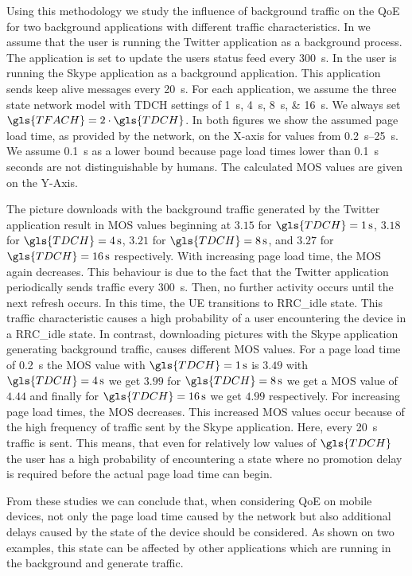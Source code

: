 Using this methodology we study the influence of background traffic on the \gls{QoE} for two background applications with different traffic characteristics.
In  we assume that the user is running the Twitter application as a background process.
The application is set to update the users status feed every \SI{300}{\second}.
In  the user is running the Skype application as a background application.
This application sends keep alive messages every \SI{20}{\second}.
For each application, we assume the three state network model with \gls{TDCH} settings of \SIlist{1;4;8;16}{\second}.
We always set \(\gls{TFACH} = 2\cdot \gls{TDCH}\).
In both figures we show the assumed page load time, as provided by the network, on the X-axis for values from \SIrange{0.2}{25}{\second}.
We assume \SI{0.1}{\second} as a lower bound because page load times lower than \SI{0.1}{\second} seconds are not distinguishable \cite{egger2012b} by humans.
The calculated \gls{MOS} values are given on the Y-Axis.

The picture downloads with the background traffic generated by the Twitter application result in \gls{MOS} values beginning at \(3.15\) for \(\gls{TDCH} = \SI{1}{\second}\), \(3.18\) for \(\gls{TDCH} = \SI{4}{\second}\), \(3.21\) for \(\gls{TDCH} = \SI{8}{\second}\), and \(3.27\) for \(\gls{TDCH} = \SI{16}{\second}\) respectively.
With increasing page load time, the \gls{MOS} again decreases.
This behaviour is due to the fact that the Twitter application periodically sends traffic every \SI{300}{\second}.
Then, no further activity occurs until the next refresh occurs.
In this time, the \gls{UE} transitions to \gls{RRC_idle} state.
This traffic characteristic causes a high probability of a user encountering the device in a \gls{RRC_idle} state.
In contrast, downloading pictures with the Skype application generating background traffic, causes different \gls{MOS} values.
For a page load time of \SI{0.2}{\second} the \gls{MOS} value with \(\gls{TDCH} = \SI{1}{\second}\) is \(3.49\) with \(\gls{TDCH} = \SI{4}{\second}\) we get \(3.99\) for \(\gls{TDCH} = \SI{8}{\second}\) we get a \gls{MOS} value of \(4.44\) and finally for \(\gls{TDCH} = \SI{16}{\second}\) we get \(4.99\) respectively.
For increasing page load times, the \gls{MOS} decreases.
This increased \gls{MOS} values occur because of the high frequency of traffic sent by the Skype application.
Here, every \SI{20}{\second} traffic is sent.
This means, that even for relatively low values of \(\gls{TDCH}\) the user has a high probability of encountering a state where no promotion delay is required before the actual page load time can begin.

From these studies we can conclude that, when considering \gls{QoE} on mobile devices, not only the page load time caused by the network but also additional delays caused by the state of the device should be considered.
As shown on two examples, this state can be affected by other applications which are running in the background and generate traffic.


